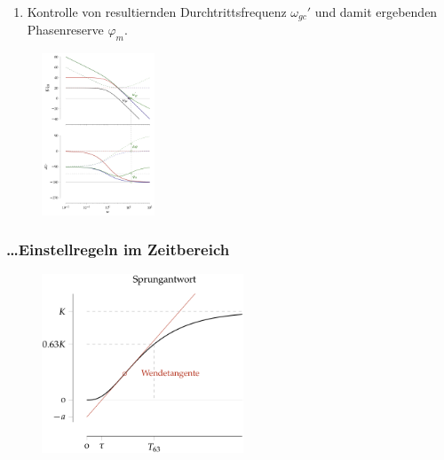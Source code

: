 \documentclass[
  10pt,
  a4paper,
  twocolumn]{article}
\providecommand{\tightlist}{%
  \setlength{\itemsep}{0pt}\setlength{\parskip}{0pt}}\usepackage{longtable,booktabs,array}
\numberwithin{equation}{section}
\begin{document}
\begin{tcolorbox}
\begin{enumerate}
\def\labelenumi{\arabic{enumi}.}
\setcounter{enumi}{3}
\tightlist
\item
  Kontrolle von resultiernden Durchtrittsfrequenz \(\omega_{gc}'\) und
  damit ergebenden Phasenreserve \(\varphi_m\).
\end{enumerate}

\begin{figure}[H]

{\centering \includegraphics[width=0.3\textwidth,height=\textheight]{images/pid_regler/auslegung_bodediagramm.png}

}

\end{figure}

\end{tcolorbox}

\hypertarget{einstellregeln-im-zeitbereich}{%
\subsubsection{\ldots Einstellregeln im
Zeitbereich}\label{einstellregeln-im-zeitbereich}}

\begin{figure}[H]

{\centering \includegraphics[width=6cm,height=\textheight]{images/paste-25.png}

}

\end{figure}
\end{document}

